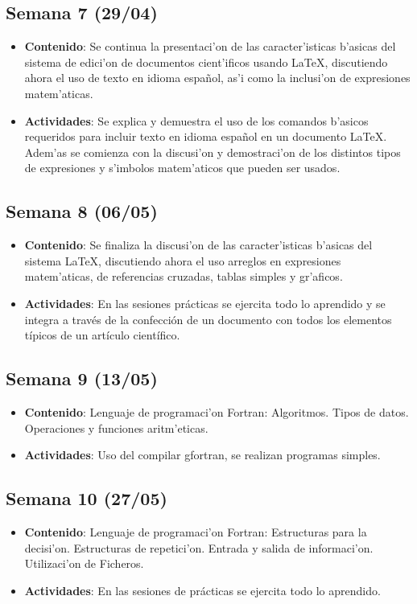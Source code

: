 \documentclass[letterpaper,11pt]{exam}
\begin{document}
\begin{multicols}{2}
\begin{scriptsize}
\subsection*{Semana 7 (29/04)}
\begin{itemize}
\item \textbf{Contenido}: Se continua la presentaci'on de las caracter'isticas b'asicas del sistema de edici'on de documentos cient'ificos usando \LaTeX, discutiendo ahora el uso de texto en idioma espa\~nol, as'i como la inclusi'on de expresiones matem'aticas.
\item \textbf{Actividades}: Se explica y demuestra el uso de los comandos b'asicos requeridos para incluir texto en idioma espa\~nol en un documento \LaTeX. Adem'as se comienza con la discusi'on y demostraci'on de los distintos tipos de expresiones y s'imbolos matem'aticos que pueden ser usados.
\end{itemize}

\subsection*{Semana 8 (06/05)}
\begin{itemize}
\item \textbf{Contenido}: Se finaliza la discusi'on de las caracter'isticas b'asicas del sistema \LaTeX, discutiendo ahora el uso arreglos en expresiones matem'aticas, de referencias cruzadas, tablas simples y gr'aficos.
\item \textbf{Actividades}: En las sesiones prácticas se ejercita todo lo aprendido y se integra a través de la confección de un documento con todos los elementos típicos de un artículo científico.
\end{itemize}


\subsection*{Semana 9 (13/05)}
\begin{itemize}
\item \textbf{Contenido}: Lenguaje de programaci'on Fortran: Algoritmos. Tipos de datos. Operaciones y funciones aritm'eticas. 
\item \textbf{Actividades}: Uso del compilar gfortran, se realizan programas simples.
\end{itemize}


\subsection*{Semana 10 (27/05)}
\begin{itemize}
\item \textbf{Contenido}: Lenguaje de programaci'on Fortran: Estructuras para la decisi'on. Estructuras de repetici'on. Entrada y salida de informaci'on. Utilizaci'on de Ficheros.
\item \textbf{Actividades}: En las sesiones de prácticas se ejercita todo lo aprendido.
\end{itemize}



\end{scriptsize}
\end{multicols}
\end{document}
